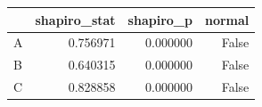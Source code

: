 \begin{tabular}{lrrr}
\toprule
 & shapiro_stat & shapiro_p & normal \\
\midrule
A & 0.756971 & 0.000000 & False \\
B & 0.640315 & 0.000000 & False \\
C & 0.828858 & 0.000000 & False \\
\bottomrule
\end{tabular}
